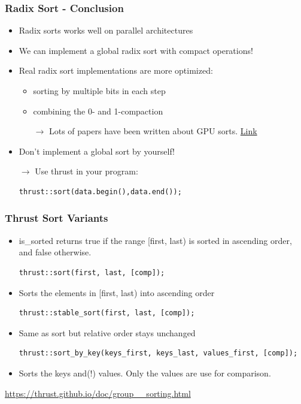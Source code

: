 \documentclass[aspectratio=169]{beamer}
\begin{document}
\begin{frame}[fragile]
	\frametitle{Radix Sort - Conclusion}
	\begin{itemize}
		\item Radix sorts works well on parallel architectures
		\item We can implement a global radix sort with compact operations!
		\item Real radix sort implementations are more optimized:
		\begin{itemize}
			\item sorting by multiple bits in each step
			\item combining the 0- and 1-compaction
			\item[$\rightarrow$] Lots of papers have been written about GPU sorts. 
			\href{https://ieeexplore.ieee.org/abstract/document/5161005}{Link}
		\end{itemize}
	\item Don't implement a global sort by yourself!
	\item[$\rightarrow$] Use thrust in your program:
\begin{lstlisting}
thrust::sort(data.begin(),data.end());
\end{lstlisting}
	\end{itemize}
\end{frame}

 	
\begin{frame}[fragile]
\frametitle{Thrust Sort Variants}

\begin{itemize}
\begin{lstlisting}
thrust::is_sorted(first, last);		
\end{lstlisting}
	\item is\_sorted returns true if the range [first, last) is sorted in ascending order, and false otherwise.
\begin{lstlisting}
thrust::sort(first, last, [comp]);		
\end{lstlisting}
\item Sorts the elements in [first, last) into ascending order
\begin{lstlisting}
thrust::stable_sort(first, last, [comp]);		
\end{lstlisting}
\item Same as sort but relative order stays unchanged
\begin{lstlisting}
thrust::sort_by_key(keys_first, keys_last, values_first, [comp]);
\end{lstlisting}
\item Sorts the keys and(!) values. Only the values are use for comparison.
\end{itemize}
\url{https://thrust.github.io/doc/group__sorting.html}
\end{frame}
\end{document}
